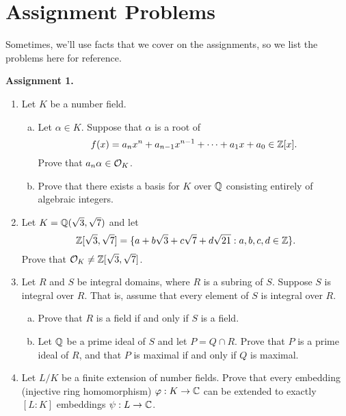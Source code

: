 \appendix 
\section{Assignment Problems}
Sometimes, we'll use facts that we cover on the assignments, 
so we list the problems here for reference. 

{\bf Assignment 1.} 
\begin{enumerate}[leftmargin=1.5cm, label={{\bf A1-\arabic*}}]
    \item \label{A1-1} Let $K$ be a number field. \begin{enumerate}[(a)]
        \item Let $\alpha \in K$. Suppose that $\alpha$ is a root of 
        \[ f(x) = a_n x^n + a_{n-1} x^{n-1} + \cdots + a_1 x + a_0 \in \mathbb{Z}[x]. \] 
        Prove that $a_n \alpha \in {\cal O}_K$. 
        \item Prove that there exists a basis for 
        $K$ over $\mathbb{Q}$ consisting entirely of algebraic integers. 
    \end{enumerate} 
    \item \label{A1-2} Let $K = \mathbb{Q}(\sqrt{3}, \sqrt{7})$ and let 
    \[ \mathbb{Z}[\sqrt{3}, \sqrt{7}] = \{a + b\sqrt{3} + c\sqrt{7} + d\sqrt{21} : 
    a, b, c, d \in \mathbb{Z}\}. \] 
    Prove that ${\cal O}_K \neq \mathbb{Z}[\sqrt{3}, \sqrt{7}]$. 
    \item \label{A1-3} Let $R$ and $S$ be integral domains, where $R$ is a subring of $S$. 
    Suppose $S$ is integral over $R$. That is, assume that every element of 
    $S$ is integral over $R$. 
    \begin{enumerate}[(a)]
        \item Prove that $R$ is a field if and only if $S$ is a field. 
        \item Let $\mathbb{Q}$ be a prime ideal of $S$ and let $P = Q \cap R$. 
        Prove that $P$ is a prime ideal of $R$, and that $P$ is maximal 
        if and only if $Q$ is maximal.
    \end{enumerate}
    \item \label{A1-4} Let $L/K$ be a finite extension of number fields. 
    Prove that every embedding (injective ring homomorphism) $\varphi : 
    K \to \mathbb{C}$ can be extended to exactly $[L : K]$ embeddings $\psi : L \to \mathbb{C}$.
\end{enumerate}
